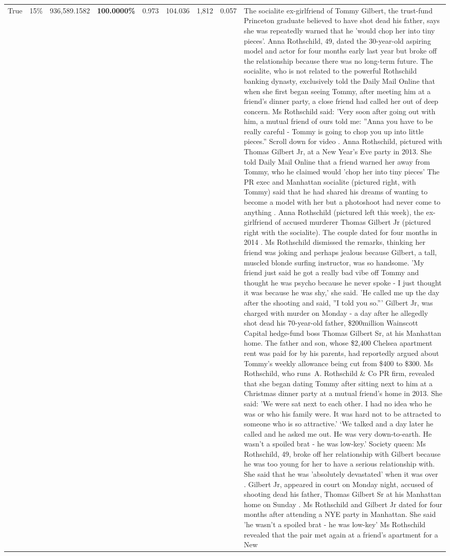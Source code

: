 \begin{table}[H]
\begin{tabular}{lllrlllll}
True & 15\% & 936,589.1582 & \bfseries \color{red} 100.0000\% & 0.973 & 104.036 & 1,812 & 0.057 & The socialite ex-girlfriend of Tommy Gilbert, the trust-fund Princeton graduate believed to have shot dead his father, says she was repeatedly warned that he 'would chop her into tiny pieces'. Anna Rothschild, 49, dated the 30-year-old aspiring model and actor for four months early last year but broke off the relationship because there was no long-term future. The socialite, who is not related to the powerful Rothschild banking dynasty, exclusively told the Daily Mail Online that when she first began seeing Tommy, after meeting him at a friend's dinner party, a close friend had called her out of deep concern. Ms Rothschild said: 'Very soon after going out with him, a mutual friend of ours told me: ''Anna you have to be really careful - Tommy is going to chop you up into little pieces.'' Scroll down for video . Anna Rothschild, pictured with Thomas Gilbert Jr, at a New Year's Eve party in 2013. She told Daily Mail Online that a friend warned her away from Tommy, who he claimed would 'chop her into tiny pieces' The PR exec and Manhattan socialite (pictured right, with Tommy) said that he had shared his dreams of wanting to become a model with her but a photoshoot had never come to anything . Anna Rothschild (pictured left this week), the ex-girlfriend of accused murderer Thomas Gilbert Jr (pictured right with the socialite). The couple dated for four months in 2014 . Ms Rothschild dismissed the remarks, thinking her friend was joking and perhaps jealous because Gilbert, a tall, muscled blonde surfing instructor, was so handsome. 'My friend just said he got a really bad vibe off Tommy and thought he was psycho because he never spoke - I just thought it was because he was shy,' she said. 'He called me up the day after the shooting and said, ''I told you so.''' Gilbert Jr, was charged with murder on Monday - a day after he allegedly shot dead his 70-year-old father, \$200million Wainscott Capital hedge-fund boss Thomas Gilbert Sr, at his Manhattan home. The father and son, whose \$2,400 Chelsea apartment rent was paid for by his parents, had reportedly argued about Tommy's weekly allowance being cut from \$400 to \$300. Ms Rothschild, who runs A. Rothschild \& Co PR firm, revealed that she began dating Tommy after sitting next to him at a Christmas dinner party at a mutual friend's home in 2013. She said: 'We were sat next to each other. I had no idea who he was or who his family were. It was hard not to be attracted to someone who is so attractive.' ‘We talked and a day later he called and he asked me out. He was very down-to-earth. He wasn’t a spoiled brat - he was low-key.’ Society queen: Ms Rothschild, 49, broke off her relationship with Gilbert because he was too young for her to have a serious relationship with. She said that he was 'absolutely devastated' when it was over . Gilbert Jr, appeared in court on Monday night, accused of shooting dead his father, Thomas Gilbert Sr at his Manhattan home on Sunday . Ms Rothschild and Gilbert Jr dated for four months after attending a NYE party in Manhattan. She said 'he wasn't a spoiled brat - he was low-key' Ms Rothschild revealed that the pair met again at a friend’s apartment for a New 
\end{tabular}
\end{table}
